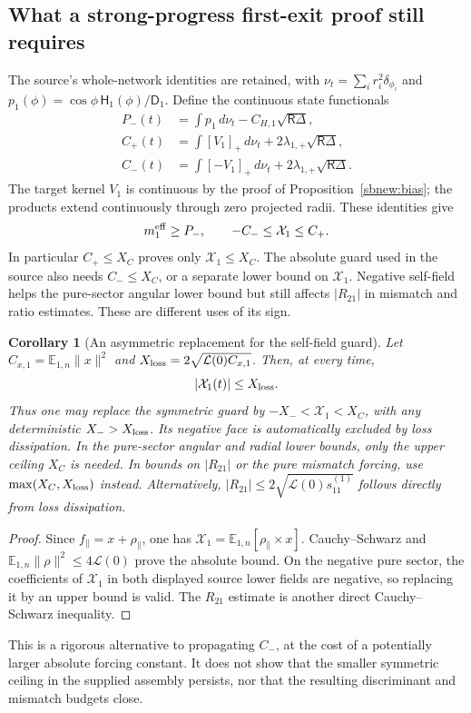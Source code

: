 \documentclass{article} %
\theoremstyle{plain}
\newtheorem{corollary}[theorem]{Corollary}
\theoremstyle{definition}
\theoremstyle{remark}
\begin{document}
\subsection{What a strong-progress first-exit proof still requires}
The source's whole-network identities are retained, with
$\nu_t=\sum_i r_i^2\delta_{\phi_i}$ and
$p_1(\phi)=\cos\phi\,\mathsf H_1(\phi)/\mathsf D_1$.
Define the continuous state functionals
\begin{align*}
 P_-(t)&=\int p_1\,d\nu_t-C_{H,1}\sqrt{\mathsf R\Delta},\\
 C_+(t)&=\int[V_1]_+\,d\nu_t+2\lambda_{1,+}\sqrt{\mathsf R\Delta},\\
 C_-(t)&=\int[-V_1]_+\,d\nu_t+2\lambda_{1,+}\sqrt{\mathsf R\Delta}.
\end{align*}
The target kernel $V_1$ is continuous by the proof of
Proposition~\ref{sbnew:bias}; the products extend continuously through
zero projected radii. These identities give
\begin{equation}\label{sbnew:signed-certificate}
 m_1^{\rm eff}\ge P_-,\qquad -C_-\le\mathcal X_1\le C_+.
\end{equation}
In particular $C_+\le X_C$ proves only $\mathcal X_1\le X_C$.
The absolute guard used in the source also needs $C_-\le X_C$, or a
separate lower bound on $\mathcal X_1$. Negative self-field helps the
pure-sector angular lower bound but still affects $|R_{21}|$ in mismatch
and ratio estimates. These are different uses of its sign.

\begin{corollary}[An asymmetric replacement for the self-field guard]
\label{sbnew:asymmetric}
Let $C_{x,1}=\mathbb E_{1,n}\|x\|^2$ and
$X_{\rm loss}=2\sqrt{\mathcal L(0)C_{x,1}}$. Then, at every time,
\[
 |\mathcal X_1(t)|\le X_{\rm loss}.
\]
Thus one may replace the symmetric guard by
$-X_-<\mathcal X_1<X_C$, with any deterministic
$X_->X_{\rm loss}$. Its negative face is automatically excluded by loss
dissipation. In the pure-sector angular and radial lower bounds, only
the upper ceiling $X_C$ is needed. In bounds on $|R_{21}|$ or the pure
mismatch forcing, use $\max(X_C,X_{\rm loss})$ instead. Alternatively,
$|R_{21}|\le2\sqrt{\mathcal L(0)s_{11}^{(1)}}$ follows directly from
loss dissipation.
\end{corollary}
\begin{proof}
Since $f_\parallel=x+\rho_\parallel$, one has
$\mathcal X_1=\mathbb E_{1,n}[\rho_\parallel\times x]$.
Cauchy--Schwarz and
$\mathbb E_{1,n}\|\rho\|^2\le4\mathcal L(0)$ prove the absolute bound.
On the negative pure sector, the coefficients of $\mathcal X_1$ in
both displayed source lower fields are negative, so replacing it by an
upper bound is valid. The $R_{21}$ estimate is another direct
Cauchy--Schwarz inequality.
\end{proof}
This is a rigorous alternative to propagating $C_-$, at the cost of a
potentially larger absolute forcing constant. It does not show that the
smaller symmetric ceiling in the supplied assembly persists, nor that
the resulting discriminant and mismatch budgets close.
\end{document}

